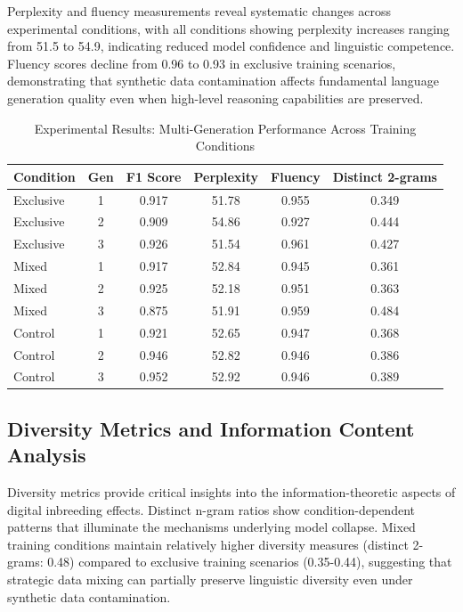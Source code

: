 \documentclass{article}
\begin{document}
Perplexity and fluency measurements reveal systematic changes across experimental conditions, with all conditions showing perplexity increases ranging from 51.5 to 54.9, indicating reduced model confidence and linguistic competence. Fluency scores decline from 0.96 to 0.93 in exclusive training scenarios, demonstrating that synthetic data contamination affects fundamental language generation quality even when high-level reasoning capabilities are preserved.

\begin{table}[h]
\centering
\caption{Experimental Results: Multi-Generation Performance Across Training Conditions}
\label{tab:results_summary}
\begin{tabular}{lccccc}
\toprule
\textbf{Condition} & \textbf{Gen} & \textbf{F1 Score} & \textbf{Perplexity} & \textbf{Fluency} & \textbf{Distinct 2-grams} \\
\midrule
Exclusive & 1 & 0.917 & 51.78 & 0.955 & 0.349 \\
Exclusive & 2 & 0.909 & 54.86 & 0.927 & 0.444 \\
Exclusive & 3 & 0.926 & 51.54 & 0.961 & 0.427 \\
\midrule
Mixed & 1 & 0.917 & 52.84 & 0.945 & 0.361 \\
Mixed & 2 & 0.925 & 52.18 & 0.951 & 0.363 \\
Mixed & 3 & 0.875 & 51.91 & 0.959 & 0.484 \\
\midrule
Control & 1 & 0.921 & 52.65 & 0.947 & 0.368 \\
Control & 2 & 0.946 & 52.82 & 0.946 & 0.386 \\
Control & 3 & 0.952 & 52.92 & 0.946 & 0.389 \\
\bottomrule
\end{tabular}
\end{table}

\subsection{Diversity Metrics and Information Content Analysis}

Diversity metrics provide critical insights into the information-theoretic aspects of digital inbreeding effects. Distinct n-gram ratios show condition-dependent patterns that illuminate the mechanisms underlying model collapse. Mixed training conditions maintain relatively higher diversity measures (distinct 2-grams: 0.48) compared to exclusive training scenarios (0.35-0.44), suggesting that strategic data mixing can partially preserve linguistic diversity even under synthetic data contamination.
\end{document}
